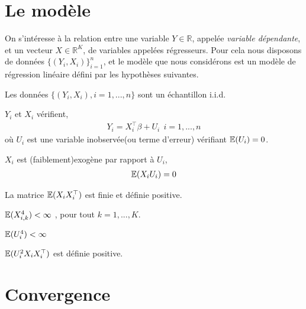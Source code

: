 \documentclass[12pt, reqno]{amsart}
\begin{document}
\section{Le modèle}
On s'intéresse à la relation entre une variable $Y\in \mathbb{R}$, appelée \emph{variable dépendante}, et un vecteur $X\in \mathbb{R}^K$, de variables appelées  régresseurs. Pour cela nous disposons de données $\{(Y_i, X_i)\}_{i=1}^n$, et le modèle que nous considérons est un modèle de régression linéaire défini par les hypothèses suivantes.
\begin{assumption}
Les données  $\{(Y_i, X_i), i = 1,...,n\}$ sont un échantillon i.i.d.
\label{hy1}
\end{assumption}
\begin{assumption} $Y_i$  et $X_i$ vérifient,
\begin{align*} 
Y_i= X_i^\top\beta + U_i \ \ i = 1,...,n
\end{align*}
où $U_i$ est une variable inobservée(ou terme d'erreur) vérifiant $\mathbb{E}(U_i) = 0$.
\label{hy2} 
\end{assumption}
\begin{assumption}$X_i$ est (faiblement)exogène par rapport à $U_i$,
\begin{align*}
\mathbb{E}(X_iU_i) = 0
\end{align*}
\label{hy3} 
\end{assumption}
\begin{assumption} 
La matrice $\mathbb{E}(X_iX_i^\top)$ est finie et définie positive.
\label{hy4}
\end{assumption}
\begin{assumption}
$\mathbb{E}(X_{i,k}^4) < \infty$ , pour tout $k=1,...,K$.
\label{hy5}
\end{assumption}
\begin{assumption}
$\mathbb{E}(U_i^4) < \infty$
\label{hy6}
\end{assumption}
\begin{assumption}
$\mathbb{E}(U_i^2X_iX_i^\top)$ est définie positive.
\label{hy7}
\end{assumption}

\section{Convergence}
\end{document}
